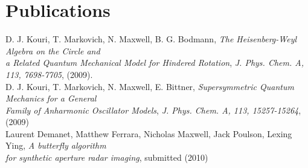 \documentclass[letterpaper]{article}
\begin{document}
\section*{Publications}
\begin{flushleft}
\hspace{0.25in} D. J. Kouri, T. Markovich, N. Maxwell, B. G. Bodmann, {\it The Heisenberg-Weyl Algebra on the Circle and\\
\hspace{0.25in}  a Related Quantum Mechanical Model for Hindered Rotation}, \textit{J. Phys. Chem. A, 113, 7698-7705}, (2009).\\
\vspace{0.15in}
\hspace{0.25in} D. J. Kouri, T. Markovich, N. Maxwell, E. Bittner, {\it Supersymmetric Quantum Mechanics for a General \\
\hspace{0.25in}    Family of Anharmonic Oscillator Models}, \textit{J. Phys. Chem. A, 113, 15257-15264}, (2009)\\
\vspace{0.15in}
\hspace{0.25in} Laurent Demanet, Matthew Ferrara, Nicholas Maxwell, Jack Poulson, Lexing Ying, {\it A butterfly algorithm \\
\hspace{0.25in} for synthetic aperture radar imaging}, submitted (2010) \\
\end{flushleft}
\end{document}
